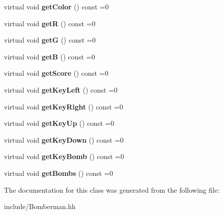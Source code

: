 \begin{DoxyCompactItemize}
\item 
\hypertarget{class_i_bomberman_a229d6eeaac51a8578960f556934b9a7e}{virtual void {\bfseries get\+Color} () const =0}\label{class_i_bomberman_a229d6eeaac51a8578960f556934b9a7e}

\item 
\hypertarget{class_i_bomberman_a2ccf09490baac329034713861635e820}{virtual void {\bfseries get\+R} () const =0}\label{class_i_bomberman_a2ccf09490baac329034713861635e820}

\item 
\hypertarget{class_i_bomberman_aeb8960d47b83a62feda826fc73cb9e7e}{virtual void {\bfseries get\+G} () const =0}\label{class_i_bomberman_aeb8960d47b83a62feda826fc73cb9e7e}

\item 
\hypertarget{class_i_bomberman_a6080612f894a916d78ca0154188db892}{virtual void {\bfseries get\+B} () const =0}\label{class_i_bomberman_a6080612f894a916d78ca0154188db892}

\item 
\hypertarget{class_i_bomberman_a889b85e04add9ed9a33edc1a1d46afac}{virtual void {\bfseries get\+Score} () const =0}\label{class_i_bomberman_a889b85e04add9ed9a33edc1a1d46afac}

\item 
\hypertarget{class_i_bomberman_a5a06bf00968e8eda37645eeb3d90434f}{virtual void {\bfseries get\+Key\+Left} () const =0}\label{class_i_bomberman_a5a06bf00968e8eda37645eeb3d90434f}

\item 
\hypertarget{class_i_bomberman_a68cb3258dccdd0520d6c9688636f02dc}{virtual void {\bfseries get\+Key\+Right} () const =0}\label{class_i_bomberman_a68cb3258dccdd0520d6c9688636f02dc}

\item 
\hypertarget{class_i_bomberman_a7e36602b802cdf4ca5905f801180e4cd}{virtual void {\bfseries get\+Key\+Up} () const =0}\label{class_i_bomberman_a7e36602b802cdf4ca5905f801180e4cd}

\item 
\hypertarget{class_i_bomberman_ab4347d29a2ffee353cbba270965529a2}{virtual void {\bfseries get\+Key\+Down} () const =0}\label{class_i_bomberman_ab4347d29a2ffee353cbba270965529a2}

\item 
\hypertarget{class_i_bomberman_a2234c8c27636ba6651f3b24abae4b7a6}{virtual void {\bfseries get\+Key\+Bomb} () const =0}\label{class_i_bomberman_a2234c8c27636ba6651f3b24abae4b7a6}

\item 
\hypertarget{class_i_bomberman_a6c389c3d14a7e8ebd8f36e9de0a09463}{virtual void {\bfseries get\+Bombs} () const =0}\label{class_i_bomberman_a6c389c3d14a7e8ebd8f36e9de0a09463}

\end{DoxyCompactItemize}


The documentation for this class was generated from the following file\+:\begin{DoxyCompactItemize}
\item 
include/Bomberman.\+hh\end{DoxyCompactItemize}
